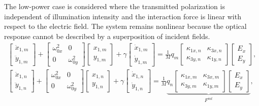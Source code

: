The low-power case is considered where the transmitted polarization is independent of illumination intensity and the interaction force is linear with respect to the electric field. The system remains nonlinear because the optical response cannot be described by a superposition of incident fields. %
\begin{equation}
\begin{aligned}
\begin{bmatrix}\ddot{x}_{1,m}\\\ddot{y}_{1,m}\end{bmatrix} +\begin{bmatrix}
\omega_{0x}^2 & 0\\
0 & \omega_{0y}^2
\end{bmatrix} \begin{bmatrix}x_{1,m}\\y_{1,m}\end{bmatrix} +\gamma\begin{bmatrix}\dot{x}_{1,m}\\\dot{y}_{1,m}\end{bmatrix} =  \frac{1}{M}q_m\begin{bmatrix}
\kappa_{1x,n} & \kappa_{3x,n}\\
\kappa_{3y,n} & \kappa_{1y,n}
\end{bmatrix}\begin{bmatrix}E_x\\E_y\end{bmatrix},\\
\begin{bmatrix}\ddot{x}_{1,n}\\\ddot{y}_{1,n}\end{bmatrix} +\begin{bmatrix}
\omega_{0x}^2 & 0\\
0 & \omega_{0y}^2
\end{bmatrix}\begin{bmatrix}x_{1,n}\\y_{1,n}\end{bmatrix} +\gamma\begin{bmatrix}\dot{x}_{1,n}\\\dot{y}_{1,n}\end{bmatrix} =  \frac{1}{M} \underbrace{q_n\begin{bmatrix}
\kappa_{1x,m} & \kappa_{3x,m}\\
\kappa_{3y,m} & \kappa_{1y,m}
\end{bmatrix}\begin{bmatrix}E_x\\E_y\end{bmatrix}}_\text{$F^{int}$},
\label{eq:xymotion}
\end{aligned}
\end{equation}
